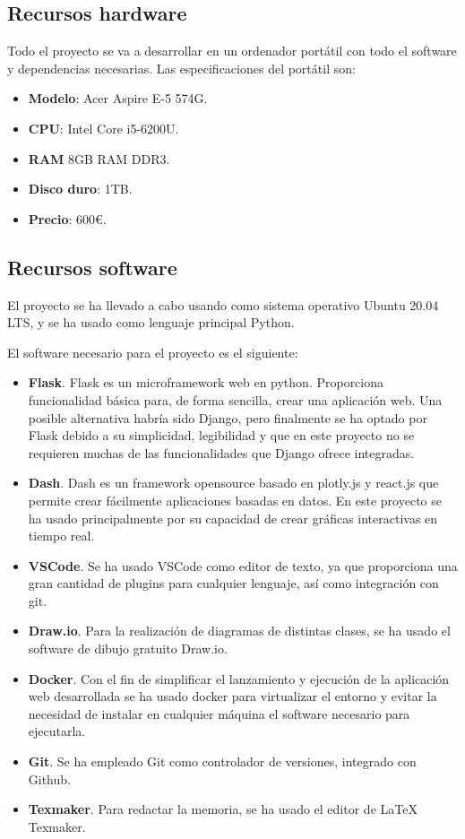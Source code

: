 \subsection{Recursos hardware}

Todo el proyecto se va a desarrollar en un ordenador portátil con todo el software y dependencias necesarias. Las especificaciones del portátil son:

\begin{itemize}
\item \textbf{Modelo}: Acer Aspire E-5 574G.
\item \textbf{CPU}: Intel Core i5-6200U.
\item \textbf{RAM} 8GB RAM DDR3.
\item \textbf{Disco duro}: 1TB.
\item \textbf{Precio}: 600€.
\end{itemize}

\subsection{Recursos software}

El proyecto se ha llevado a cabo usando como sistema operativo Ubuntu 20.04 LTS, y se ha usado como lenguaje principal Python.

El software necesario para el proyecto es el siguiente:

\begin{itemize}
\item \textbf{Flask}. Flask es un microframework web en python. Proporciona funcionalidad básica para, de forma sencilla, crear una aplicación web. Una posible alternativa habría sido Django, pero finalmente se ha optado por Flask debido a su simplicidad, legibilidad y que en este proyecto no se requieren muchas de las funcionalidades que Django ofrece integradas. 
\item \textbf{Dash}. Dash es un framework opensource basado en plotly.js y react.js que permite crear fácilmente aplicaciones basadas en datos. En este proyecto se ha usado principalmente por su capacidad de crear gráficas interactivas en tiempo real. 
\item \textbf{VSCode}. Se ha usado VSCode como editor de texto, ya que proporciona una gran cantidad de plugins para cualquier lenguaje, así como integración con git.
\item \textbf{Draw.io}. Para la realización de diagramas de distintas clases, se ha usado el software de dibujo gratuito Draw.io.
\item \textbf{Docker}. Con el fin de simplificar el lanzamiento y ejecución de la aplicación web desarrollada se ha usado docker para virtualizar el entorno y evitar la necesidad de instalar en cualquier máquina el software necesario para ejecutarla.
\item \textbf{Git}. Se ha empleado Git como controlador de versiones, integrado con Github.
\item \textbf{Texmaker}. Para redactar la memoria, se ha usado el editor de LaTeX Texmaker.
\end{itemize}

